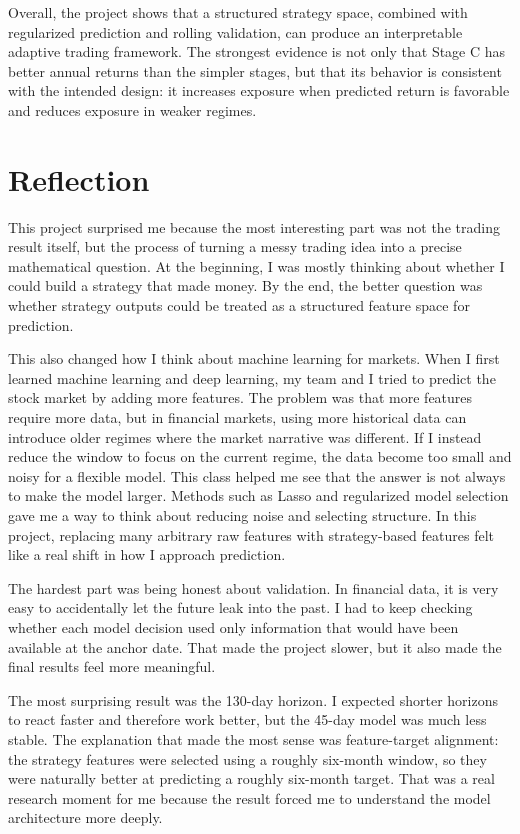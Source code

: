 \documentclass[11pt, letterpaper]{article}
\begin{document}
Overall, the project shows that a structured strategy space, combined with regularized prediction and rolling validation, can produce an interpretable adaptive trading framework. The strongest evidence is not only that Stage C has better annual returns than the simpler stages, but that its behavior is consistent with the intended design: it increases exposure when predicted return is favorable and reduces exposure in weaker regimes.

\clearpage



\clearpage
\section*{Reflection}

This project surprised me because the most interesting part was not the trading result itself, but the process of turning a messy trading idea into a precise mathematical question. At the beginning, I was mostly thinking about whether I could build a strategy that made money. By the end, the better question was whether strategy outputs could be treated as a structured feature space for prediction.

This also changed how I think about machine learning for markets. When I first learned machine learning and deep learning, my team and I tried to predict the stock market by adding more features. The problem was that more features require more data, but in financial markets, using more historical data can introduce older regimes where the market narrative was different. If I instead reduce the window to focus on the current regime, the data become too small and noisy for a flexible model. This class helped me see that the answer is not always to make the model larger. Methods such as Lasso and regularized model selection gave me a way to think about reducing noise and selecting structure. In this project, replacing many arbitrary raw features with strategy-based features felt like a real shift in how I approach prediction.

The hardest part was being honest about validation. In financial data, it is very easy to accidentally let the future leak into the past. I had to keep checking whether each model decision used only information that would have been available at the anchor date. That made the project slower, but it also made the final results feel more meaningful.

The most surprising result was the 130-day horizon. I expected shorter horizons to react faster and therefore work better, but the 45-day model was much less stable. The explanation that made the most sense was feature-target alignment: the strategy features were selected using a roughly six-month window, so they were naturally better at predicting a roughly six-month target. That was a real research moment for me because the result forced me to understand the model architecture more deeply.
\end{document}
